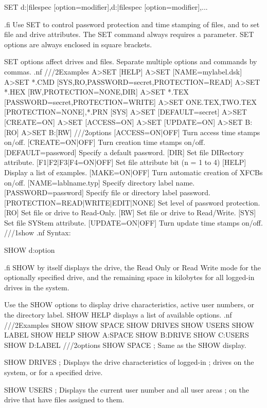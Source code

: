 SET d:|filespec [option{=modifier}]{,d:|filespec [option{=modifier}],...}

.fi
Use SET to control password protection and time stamping of files, 
and to set file and drive attributes. The SET command always requires 
a parameter. SET options are always enclosed in square brackets.  

SET options affect drives and files.  Separate multiple options 
and commands by commas. 
.nf
///2Examples
A>SET [HELP]     
A>SET [NAME=mylabel.dsk]
A>SET *.CMD [SYS,RO,PASSWORD=secret,PROTECTION=READ]
A>SET *.HEX [RW,PROTECTION=NONE,DIR]
A>SET *.TEX [PASSWORD=secret,PROTECTION=WRITE]
A>SET ONE.TEX,TWO.TEX [PROTECTION=NONE],*.PRN [SYS]
A>SET [DEFAULT=secret]
A>SET [CREATE=ON]
A>SET [ACCESS=ON]
A>SET [UPDATE=ON]
A>SET B:[RO]
A>SET B:[RW]
///2options
[ACCESS=ON|OFF]       Turn access time stamps on/off.
[CREATE=ON|OFF]       Turn creation time stamps on/off.
[DEFAULT=password]    Specify a default password.
[DIR]                 Set file DIRectory attribute.
[F1|F2|F3|F4=ON|OFF]  Set file attribute bit (n = 1 to 4)
[HELP]                Display a list of examples.
[MAKE=ON|OFF]         Turn automatic creation of XFCBs on/off.
[NAME=lablname.typ]   Specify directory label name.
[PASSWORD=password]   Specify file or directory label password.
[PROTECTION=READ|WRITE|EDIT|NONE]   Set level of password protection.
[RO]                  Set file or drive to Read-Only.
[RW]                  Set file or drive to Read/Write.
[SYS]                 Set file SYStem attribute.
[UPDATE=ON|OFF]       Turn update time stamps on/off.
///1show
.nf
Syntax:

SHOW {d:}{option}

.fi
SHOW by itself displays the drive, the Read Only or Read Write
mode for the optionally specified drive, and the remaining space 
in kilobytes for all logged-in drives in the system. 

Use the SHOW options to display drive characteristics, active 
user numbers, or the directory label. SHOW HELP displays a
list of available options.
.nf
///2Examples
SHOW 
SHOW SPACE
SHOW DRIVES
SHOW USERS
SHOW LABEL
SHOW HELP
SHOW A:SPACE
SHOW B:DRIVE
SHOW C:USERS
SHOW D:LABEL
///2options
SHOW SPACE    ; Same as the SHOW display. 

SHOW DRIVES   ; Displays the drive characteristics of logged-in
              ; drives on the system, or for a specified drive. 

SHOW USERS    ; Displays the current user number and all user areas 
              ; on the drive that have files assigned to them.

